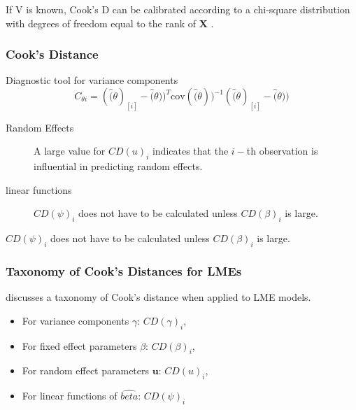 \documentclass[12pt, a4paper]{report}
\theoremstyle{plain}
\theoremstyle{definition}
\theoremstyle{remark}
\begin{document}
	If V is known, Cook's D can be calibrated according to a chi-square distribution with degrees of freedom equal to the rank of $\boldsymbol{X}$ \citep{cpj92}.
	
	

	
	

	
	
	
	
	
\subsubsection{Cook's Distance}

Diagnostic tool for variance components
\[ C_{\theta i} =(\hat(\theta)_{[i]} - \hat(\theta))^{T}\mbox{cov}( \hat(\theta))^{-1}(\hat(\theta)_{[i]} - \hat(\theta))\]

\begin{description}
	\item[Random Effects]	
	A large value for $CD(u)_i$ indicates that the $i-$th observation is influential in predicting random effects.
	\item[linear functions]
	$CD(\psi)_i$ does not have to be calculated unless $CD(\beta)_i$ is large.
\end{description}


$CD(\psi)_i$ does not have to be calculated unless $CD(\beta)_i$ is large.











\subsubsection{Taxonomy of Cook's Distances for LMEs}
	\citet{schabenberger} discusses a taxonomy of Cook's distance when applied to LME models. \begin{itemize}
		\item For variance components $\gamma$: $CD(\gamma)_i$,
		\item For fixed effect parameters $\beta$: $CD(\beta)_i$,
		\item For random effect parameters $\boldsymbol{u}$: $CD(u)_i$,
		\item For linear functions of $\hat{beta}$: $CD(\psi)_i$
	\end{itemize}			
\end{document}
